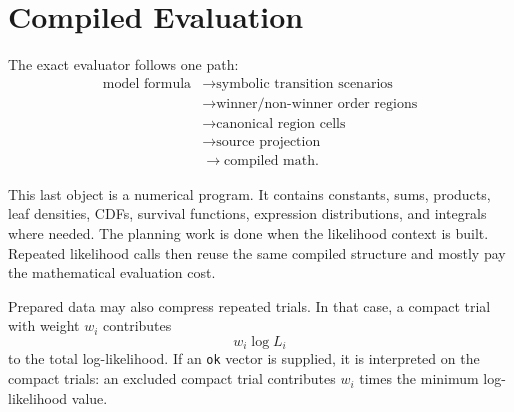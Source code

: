 \documentclass[11pt]{article}
\begin{document}
\section{Compiled Evaluation}

The exact evaluator follows one path:
\[
\begin{aligned}
\text{model formula}
&\rightarrow \text{symbolic transition scenarios} \\
&\rightarrow \text{winner/non-winner order regions} \\
&\rightarrow \text{canonical region cells} \\
&\rightarrow \text{source projection} \\
&\rightarrow \text{compiled math}.
\end{aligned}
\]

This last object is a numerical program. It contains constants, sums, products,
leaf densities, CDFs, survival functions, expression distributions, and
integrals where needed. The planning work is done when the likelihood context
is built. Repeated likelihood calls then reuse the same compiled structure and
mostly pay the mathematical evaluation cost.

Prepared data may also compress repeated trials. In that case, a compact trial
with weight $w_i$ contributes
\[
w_i \log L_i
\]
to the total log-likelihood. If an \texttt{ok} vector is supplied, it is
interpreted on the compact trials: an excluded compact trial contributes
$w_i$ times the minimum log-likelihood value.
\end{document}
